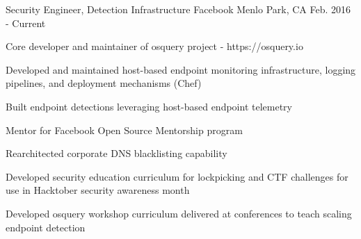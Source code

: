 


\begin{cventries}




\cventry
{Security Engineer, Detection Infrastructure} %
{Facebook} %
{Menlo Park, CA} %
{Feb. 2016 - Current} %
{ %
\begin{cvitems}
\item {Core developer and maintainer of osquery project - https://osquery.io}
\item {Developed and maintained host-based endpoint monitoring infrastructure, logging pipelines, and deployment mechanisms (Chef)}
\item {Built endpoint detections leveraging host-based endpoint telemetry}
\item {Mentor for Facebook Open Source Mentorship program}
\item {Rearchitected corporate DNS blacklisting capability}
\item {Developed security education curriculum for lockpicking and CTF challenges for use in Hacktober security awareness month}
\item {Developed osquery workshop curriculum delivered at conferences to teach scaling endpoint detection}
\end{cvitems}
}


\end{cventries}
